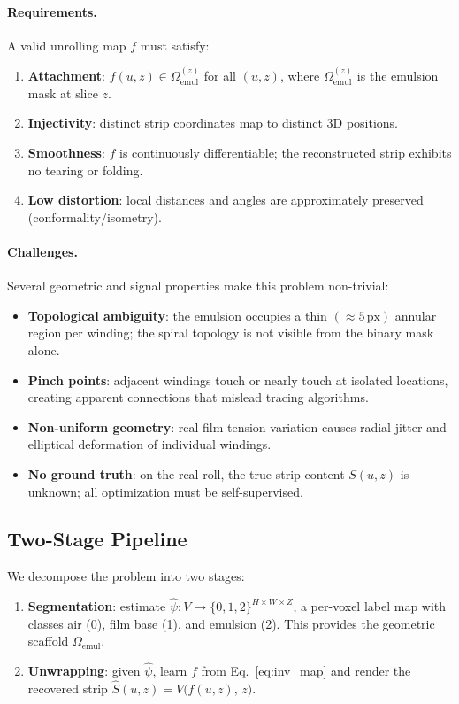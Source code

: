 \documentclass[11pt,a4paper]{article}
\begin{document}
\paragraph{Requirements.} A valid unrolling map $f$ must satisfy:
\begin{enumerate}
    \item \textbf{Attachment}: $f(u, z) \in \Omega_{\text{emul}}^{(z)}$ for all $(u, z)$, where $\Omega_{\text{emul}}^{(z)}$ is the emulsion mask at slice $z$.
    \item \textbf{Injectivity}: distinct strip coordinates map to distinct 3D positions.
    \item \textbf{Smoothness}: $f$ is continuously differentiable; the reconstructed strip exhibits no tearing or folding.
    \item \textbf{Low distortion}: local distances and angles are approximately preserved (conformality/isometry).
\end{enumerate}

\paragraph{Challenges.} Several geometric and signal properties make this problem non-trivial:
\begin{itemize}
    \item \textbf{Topological ambiguity}: the emulsion occupies a thin $(\approx 5\,\text{px})$ annular region per winding; the spiral topology is not visible from the binary mask alone.
    \item \textbf{Pinch points}: adjacent windings touch or nearly touch at isolated locations, creating apparent connections that mislead tracing algorithms.
    \item \textbf{Non-uniform geometry}: real film tension variation causes radial jitter and elliptical deformation of individual windings.
    \item \textbf{No ground truth}: on the real roll, the true strip content $S(u, z)$ is unknown; all optimization must be self-supervised.
\end{itemize}

\subsection{Two-Stage Pipeline}

We decompose the problem into two stages:

\begin{enumerate}
    \item \textbf{Segmentation}: estimate $\hat{\psi} : V \to \{0, 1, 2\}^{H \times W \times Z}$, a per-voxel label map with classes air (0), film base (1), and emulsion (2). This provides the geometric scaffold $\Omega_{\text{emul}}$.
    \item \textbf{Unwrapping}: given $\hat{\psi}$, learn $f$ from Eq.~\eqref{eq:inv_map} and render the recovered strip $\hat{S}(u, z) = V\bigl(f(u, z),\, z\bigr)$.
\end{enumerate}
\end{document}
